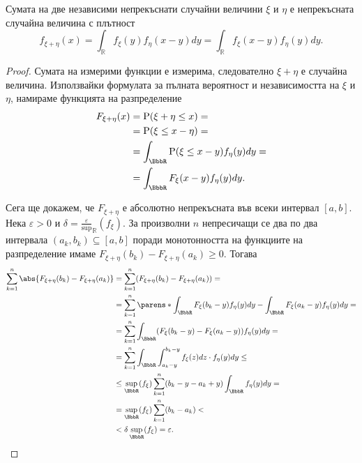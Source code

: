 \documentclass{../../common/topic}
\begin{document}
\begin{proposition}\label{thm:density_of_sum_is_convolution}
  Сумата на две независими непрекъснати случайни величини \( \xi \) и \( \eta \) е непрекъсната случайна величина с плътност
  \begin{equation*}
    f_{\xi + \eta} (x)
    =
    \int_{\BbbR} f_\xi(y) f_\eta(x - y) dy
    =
    \int_{\BbbR} f_\xi(x - y) f_\eta(y) dy.
  \end{equation*}
\end{proposition}
\begin{proof} Сумата на измерими функции е измерима, следователно \( \xi + \eta \) е случайна величина. Използвайки формулата за пълната вероятност и независимостта на \( \xi \) и \( \eta \), намираме функцията на разпределение
  \begin{align*}
    F_{\xi + \eta} (x)
    &=
    \Prob(\xi + \eta \leq x)
    = \\ &=
    \Prob(\xi \leq x - \eta)
    = \\ &=
    \int_{\BbbR} \Prob(\xi \leq x - y) f_\eta(y) dy
    = \\ &=
    \int_{\BbbR} F_\xi(x - y) f_\eta(y) dy.
  \end{align*}

  Сега ще докажем, че \( F_{\xi + \eta} \) е абсолютно непрекъсната във всеки интервал \( [a, b] \). Нека \( \varepsilon > 0 \) и \( \delta = \frac \varepsilon \sup_{\BbbR}(f_\xi) \). За произволни \( n \) непресичащи се два по два интервала \( (a_k, b_k) \subseteq [a, b] \) поради монотонността на функциите на разпределение имаме \( F_{\xi+\eta} (b_k) - F_{\xi+\eta}(a_k) \geq 0 \). Тогава
  \begin{align*}
    \sum_{k=1}^n \abs{F_{\xi+\eta} (b_k) - F_{\xi+\eta}(a_k)}
    &=
    \sum_{k=1}^n (F_{\xi+\eta} (b_k) - F_{\xi+\eta}(a_k))
    = \\ &=
    \sum_{k=1}^n \parens*{\int_{\BbbR} F_\xi(b_k - y) f_\eta(y) dy - \int_{\BbbR} F_\xi(a_k - y) f_\eta(y) dy }
    = \\ &=
    \sum_{k=1}^n \int_{\BbbR} (F_\xi(b_k - y) - F_\xi(a_k - y)) f_\eta(y) dy
    = \\ &=
    \sum_{k=1}^n \int_{\BbbR} \int_{a_k - y}^{b_k - y} f_\xi(z) dz \cdot f_\eta(y) dy
    \leq \\ &\leq
    \sup_{\BbbR}(f_\xi) \sum_{k=1}^n (b_k - y - a_k + y) \int_{\BbbR} f_\eta(y) dy
    = \\ &=
    \sup_{\BbbR}(f_\xi) \sum_{k=1}^n (b_k - a_k)
    < \\ &<
    \delta \sup_{\BbbR}(f_\xi)
    =
    \varepsilon.
  \end{align*}


\end{proof}
\end{document}
